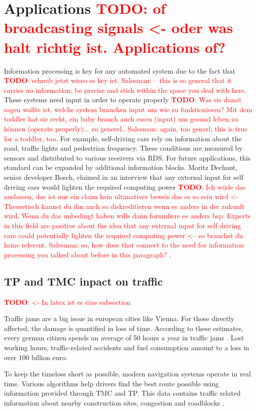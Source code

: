 \documentclass[conference,11pt,a4paper]{IEEEtran}
\newcommand{\todo}[1]{\textcolor{red}{\textbf{TODO}: #1}}
\begin{document}
	
	\section{Applications \todo{of broadcasting signals <- oder was halt richtig ist. Applications of?}}
	Information processing is key for any automated system due to the fact that \todo{schreib jetzt wieso es key ist. Salesman: – this is so general that it carries no information; be precise and stick within the space you deal with here}. These systems need input in order to operate properly \todo{Was sie damit sagen wollte ist, welche system brauchen input um wie zu funktionieren? Mit dem toddler hat sie recht, ein baby brauch auch essen (input) um gesund leben zu können (operate properly)... zu generel.. Salesman: again, too generl; this is true for a toddler, too}. For example, self-driving cars rely on information about the road, traffic lights and pedestrian frequency. These conditions are measured by sensors and distributed to various receivers via RDS. For future applications, this standard can be expanded by additional information blocks. Moritz Dechant, senior developer Bosch, claimed in an interview that any external input for self driving cars would lighten the required computing  power \cite{bosch} \todo{Ich wüde das auslassen, das ist nur ein claim kein ultimativer beweis das es so sein wird <- Theoretisch kannst du ihn auch so diskreditieren wenn es anders in der zukunft wird. Wenn du das unbedingt haben wills dann formuliere es anders bsp: Experts in this field are positive about the idea that any external input for self driving cars could potentially lighten the required computing  power <-- so brauchst du keine referent. Salesman: so, how does that connect to the need for information processing you talked about before in this paragraph? }.
	
	\subsection{TP and TMC inpact on traffic} \todo{ <- In latex ist es eine subsection}
	
	Traffic jams are a big issue in european cities like Vienna. For those directly affected, the damage is quantified in loss of time. According to these estimates, every german citizen spends an average of 50 hours a year in traffic jams \cite{Stau}. Lost working hours, traffic-related accidents and fuel consumption amount to a loss in over 100 billion euro. 
	
	To keep the timeloss short as possible, modern navigation systems operate in real time. 
	Various algorithms help drivers find the best route possible using information provided through TMC and TP. This data contains traffic related information about nearby construction sites, congestion and roadblocks \cite{uyeki2010route}.
	
\end{document}
